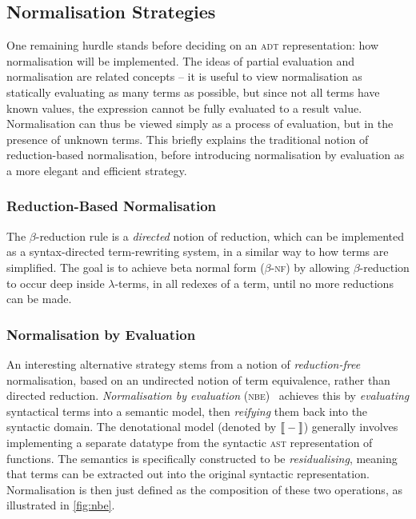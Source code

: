 \documentclass[../../../main.tex]{subfiles}
\begin{document}
\subsection{Normalisation Strategies}\label{sec:normalisation-approach}
One remaining hurdle stands before deciding on an \textsc{adt} representation: how normalisation will be implemented.
The ideas of partial evaluation and normalisation are related concepts -- it is useful to view normalisation as statically evaluating as many terms as possible, but since not all terms have known values, the expression cannot be fully evaluated to a result value.
Normalisation can thus be viewed simply as a process of evaluation, but in the presence of unknown terms.
This  briefly explains the traditional notion of reduction-based normalisation, before introducing normalisation by evaluation as a more elegant and efficient strategy.

\subsubsection{Reduction-Based Normalisation}
The $\beta$-reduction rule is a \emph{directed} notion of reduction, which can be implemented as a syntax-directed term-rewriting system, in a similar way to how  terms are simplified.
The goal is to achieve beta normal form ($\beta$-\textsc{nf}) by allowing $\beta$-reduction to occur deep inside $\lambda$-terms, in all redexes of a term, until no more reductions can be made.

\subsubsection{Normalisation by Evaluation}
An interesting alternative strategy stems from a notion of \emph{reduction-free} normalisation, based on an undirected notion of term equivalence, rather than directed reduction.
\emph{Normalisation by evaluation} (\textsc{nbe})~\cite{filinski_nbe_2004} achieves this by \emph{evaluating} syntactical terms into a semantic model, then \emph{reifying} them back into the syntactic domain.
The denotational model (denoted by $\text{\textlbrackdbl} - \text{\textrbrackdbl}$) generally involves implementing a separate datatype from the syntactic \textsc{ast} representation of functions.
The semantics is specifically constructed to be \emph{residualising}, meaning that terms can be extracted out into the original syntactic representation.
Normalisation is then just defined as the composition of these two operations, as illustrated in \cref{fig:nbe}.
\end{document}

